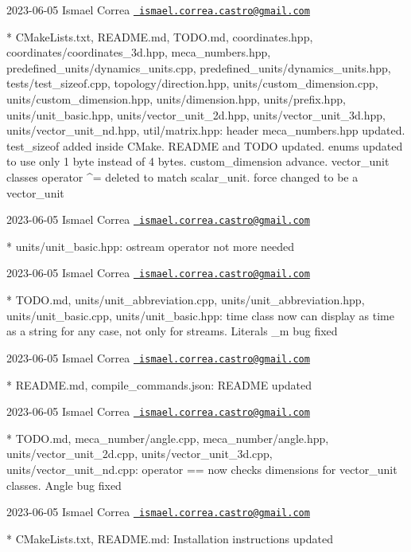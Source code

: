  2023-\/06-\/05 Ismael Correa \href{mailto:ismael.correa.castro@gmail.com}{\texttt{ ismael.\+correa.\+castro@gmail.\+com}} \begin{DoxyVerb}* CMakeLists.txt, README.md, TODO.md, coordinates.hpp,
coordinates/coordinates_3d.hpp, meca_numbers.hpp,
predefined_units/dynamics_units.cpp,
predefined_units/dynamics_units.hpp, tests/test_sizeof.cpp,
topology/direction.hpp, units/custom_dimension.cpp,
units/custom_dimension.hpp, units/dimension.hpp, units/prefix.hpp,
units/unit_basic.hpp, units/vector_unit_2d.hpp,
units/vector_unit_3d.hpp, units/vector_unit_nd.hpp, util/matrix.hpp: 
header meca_numbers.hpp updated. test_sizeof added inside CMake.
README and TODO updated. enums updated to use only 1 byte instead of
4 bytes. custom_dimension advance. vector_unit classes operator ^=
deleted to match scalar_unit. force changed to be a vector_unit
\end{DoxyVerb}
 2023-\/06-\/05 Ismael Correa \href{mailto:ismael.correa.castro@gmail.com}{\texttt{ ismael.\+correa.\+castro@gmail.\+com}} \begin{DoxyVerb}* units/unit_basic.hpp: ostream operator not more needed
\end{DoxyVerb}
 2023-\/06-\/05 Ismael Correa \href{mailto:ismael.correa.castro@gmail.com}{\texttt{ ismael.\+correa.\+castro@gmail.\+com}} \begin{DoxyVerb}* TODO.md, units/unit_abbreviation.cpp,
units/unit_abbreviation.hpp, units/unit_basic.cpp,
units/unit_basic.hpp: time class now can display as time as a string
for any case, not only for streams. Literals _m bug fixed
\end{DoxyVerb}
 2023-\/06-\/05 Ismael Correa \href{mailto:ismael.correa.castro@gmail.com}{\texttt{ ismael.\+correa.\+castro@gmail.\+com}} \begin{DoxyVerb}* README.md, compile_commands.json: README updated
\end{DoxyVerb}
 2023-\/06-\/05 Ismael Correa \href{mailto:ismael.correa.castro@gmail.com}{\texttt{ ismael.\+correa.\+castro@gmail.\+com}} \begin{DoxyVerb}* TODO.md, meca_number/angle.cpp, meca_number/angle.hpp,
units/vector_unit_2d.cpp, units/vector_unit_3d.cpp,
units/vector_unit_nd.cpp: operator == now checks dimensions for
vector_unit classes. Angle bug fixed
\end{DoxyVerb}
 2023-\/06-\/05 Ismael Correa \href{mailto:ismael.correa.castro@gmail.com}{\texttt{ ismael.\+correa.\+castro@gmail.\+com}} \begin{DoxyVerb}* CMakeLists.txt, README.md: Installation instructions updated
\end{DoxyVerb}
